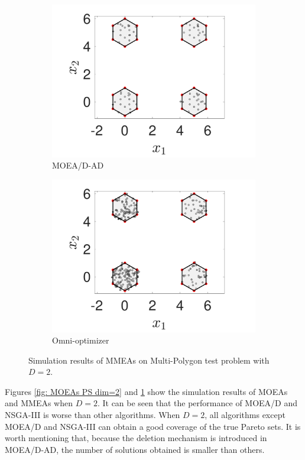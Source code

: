 \documentclass[conference]{IEEEtran}
\begin{document}
\begin{figure}[htbp]
    \begin{subfigure}[b]{.22\textwidth}
    \includegraphics[width=\linewidth]{Section5/dim2/PS/MOEADAD}
    \caption{MOEA/D-AD}
    \end{subfigure}
    \begin{subfigure}[b]{.22\textwidth}
    \includegraphics[width=\linewidth]{Section5/dim2/PS/OmniOptimizer}
    \caption{Omni-optimizer}
    \end{subfigure}
    \caption{Simulation results of MMEAs on Multi-Polygon test problem with $D=2$.}
    \label{fig: MMEAs PS dim=2}
\end{figure}

Figures \ref{fig: MOEAs PS dim=2} and \ref{fig: MMEAs PS dim=2} show the simulation results of MOEAs and MMEAs when $D=2$. It can be seen that the performance of MOEA/D and NSGA-III is worse than other algorithms. When $D=2$, all algorithms except MOEA/D and NSGA-III can obtain a good coverage of the true Pareto sets. It is worth mentioning that, because the deletion mechanism is introduced in MOEA/D-AD, the number of solutions obtained is smaller than others. 
\end{document}
